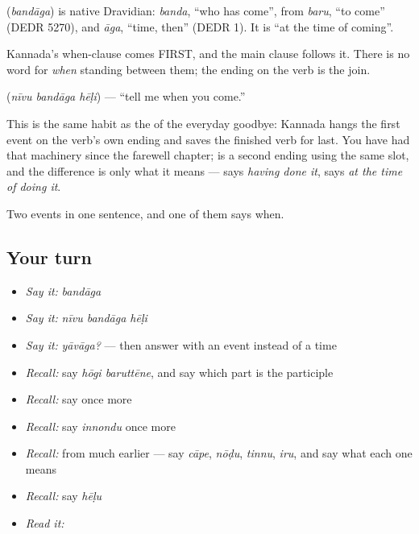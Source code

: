 \begin{cousinweb}
\textbf{} (\emph{bandāga}) is native Dravidian: \emph{banda}, \textquotedblleft{}who has come\textquotedblright{}, from \emph{baru}, \textquotedblleft{}to come\textquotedblright{} (DEDR 5270), and \emph{āga}, \textquotedblleft{}time, then\textquotedblright{} (DEDR 1). It is \textquotedblleft{}at the time of coming\textquotedblright{}.
\end{cousinweb}

\begin{grammarlens}[title={Grammar Lens: the when-clause comes first, and rides on the verb}]
Kannada's when-clause comes FIRST, and the main clause follows it. There is no word for \emph{when} standing between them; the ending on the verb is the join.

\textbf{  } (\emph{nīvu bandāga hēḷi}) — \textquotedblleft{}tell me when you come.\textquotedblright{}

This is the same habit as the  of the everyday goodbye: Kannada hangs the first event on the verb's own ending and saves the finished verb for last. You have had that machinery since the farewell chapter;  is a second ending using the same slot, and the difference is only what it means —  says \emph{having done it},  says \emph{at the time of doing it}.
\end{grammarlens}

\begin{grammarlens}[title={What you've built}]
Two events in one sentence, and one of them says when.
\end{grammarlens}

\subsection*{Your turn}
\begin{itemize}
\raggedright
  \item \emph{Say it:} \emph{bandāga}
  \item \emph{Say it:} \emph{nīvu bandāga hēḷi}
  \item \emph{Say it:} \emph{yāvāga?} — then answer with an event instead of a time
  \item \emph{Recall:} say \emph{hōgi baruttēne}, and say which part is the participle
  \item \emph{Recall:} say \emph{} once more
  \item \emph{Recall:} say \emph{innondu} once more
  \item \emph{Recall:} from much earlier — say \emph{cāpe}, \emph{nōḍu}, \emph{tinnu}, \emph{iru}, and say what each one means
  \item \emph{Recall:} say \emph{hēḷu}
  \item \emph{Read it:} \textbf{}
\end{itemize}

